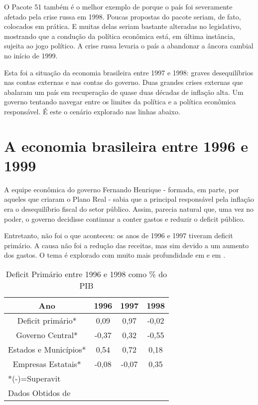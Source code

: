 \documentclass{article}
\begin{document}
O Pacote 51 também é o melhor exemplo de porque o país foi severamente afetado pela crise russa em 1998. Poucas propostas do pacote seriam, de fato, colocados em prática. E muitas delas seriam bastante alteradas no legislativo, mostrando que a condução da política econômica está, em última instância, sujeita ao jogo político. A crise russa levaria o país a abandonar a âncora cambial no início de 1999.  

Esta foi a situação da economia brasileira entre 1997 e 1998: graves desequilíbrios nas contas externas e nas contas do governo. Duas grandes crises externas que abalaram um país em recuperação de quase duas décadas de inflação alta. Um governo tentando navegar entre os limites da política e a política econômica responsável. É este o cenário explorado nas linhas abaixo.

\section{A economia brasileira entre 1996 e 1999}

A equipe econômica do governo Fernando Henrique - formada, em parte, por aqueles que criaram o Plano Real - sabia que a principal responsável pela inflação era o desequilíbrio fiscal do setor público. Assim, parecia natural que, uma vez no poder, o governo decidisse continuar a conter gastos e reduzir o deficit público.

Entretanto, não foi o que aconteceu: os anos de 1996 e 1997 tiveram deficit primário. A causa não foi a redução das receitas, mas sim devido a um aumento dos gastos. O tema é explorado com muito mais profundidade em \citet{Grossmann1998} e em \citet{Giambiagi2002}.
\smallskip

\begin{table}[h]
\begin{center}
\begin{tabular}[c]{|c|c|c|c|}
\hline
Ano & 1996 & 1997 & 1998\\ \hline
Deficit primário* & 0,09 & 0,97 & -0,02 \\ \hline
Governo Central* & -0,37 & 0,32 & -0,55\\ \hline
Estados e Municípios* & 0,54 & 0,72 & 0,18 \\ \hline
Empresas Estatais* & -0,08 & -0,07 & 0,35 \\ \hline
\multicolumn{4}{l}{*(-)=Superavit} \\
\multicolumn{4}{l}{Dados Obtidos de \citet{Giambiagi2002}} \\
\end{tabular}
\caption{Deficit Primário entre 1996 e 1998 como \% do PIB}
\end{center}
\end{table}
\end{document}
